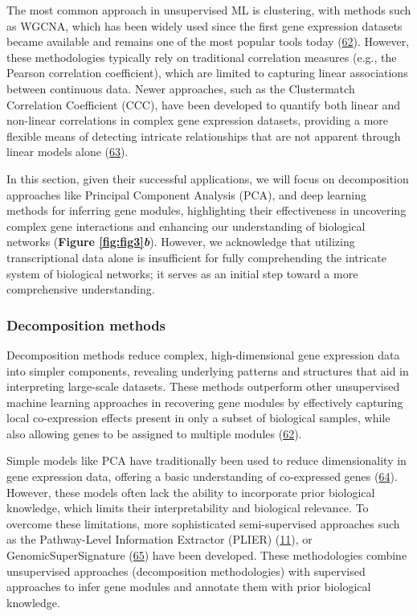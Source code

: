 The most common approach in unsupervised ML is clustering, with methods such as WGCNA, which has been widely used since the first gene expression datasets became available and remains one of the most popular tools today (\protect\hyperlink{ref-1BVbSrr6M}{62}).
However, these methodologies typically rely on traditional correlation measures (e.g., the Pearson correlation coefficient), which are limited to capturing linear associations between continuous data.
Newer approaches, such as the Clustermatch Correlation Coefficient (CCC), have been developed to quantify both linear and non-linear correlations in complex gene expression datasets, providing a more flexible means of detecting intricate relationships that are not apparent through linear models alone (\protect\hyperlink{ref-YgLIM2bZ}{63}).

In this section, given their successful applications, we will focus on decomposition approaches like Principal Component Analysis (PCA), and deep learning methods for inferring gene modules, highlighting their effectiveness in uncovering complex gene interactions and enhancing our understanding of biological networks (\textbf{Figure \ref{fig:fig3}\emph{b}}).
However, we acknowledge that utilizing transcriptional data alone is insufficient for fully comprehending the intricate system of biological networks; it serves as an initial step toward a more comprehensive understanding.

\hypertarget{decomposition-methods}{%
\subsubsection{Decomposition methods}\label{decomposition-methods}}

Decomposition methods reduce complex, high-dimensional gene expression data into simpler components, revealing underlying patterns and structures that aid in interpreting large-scale datasets.
These methods outperform other unsupervised machine learning approaches in recovering gene modules by effectively capturing local co-expression effects present in only a subset of biological samples, while also allowing genes to be assigned to multiple modules (\protect\hyperlink{ref-1BVbSrr6M}{62}).

Simple models like PCA have traditionally been used to reduce dimensionality in gene expression data, offering a basic understanding of co-expressed genes (\protect\hyperlink{ref-1703M7bru}{64}).
However, these models often lack the ability to incorporate prior biological knowledge, which limits their interpretability and biological relevance.
To overcome these limitations, more sophisticated semi-supervised approaches such as the Pathway-Level Information Extractor (PLIER) (\protect\hyperlink{ref-Ki2ij7zE}{11}), or GenomicSuperSignature (\protect\hyperlink{ref-X4fhSCkz}{65}) have been developed.
These methodologies combine unsupervised approaches (decomposition methodologies) with supervised approaches to infer gene modules and annotate them with prior biological knowledge.


